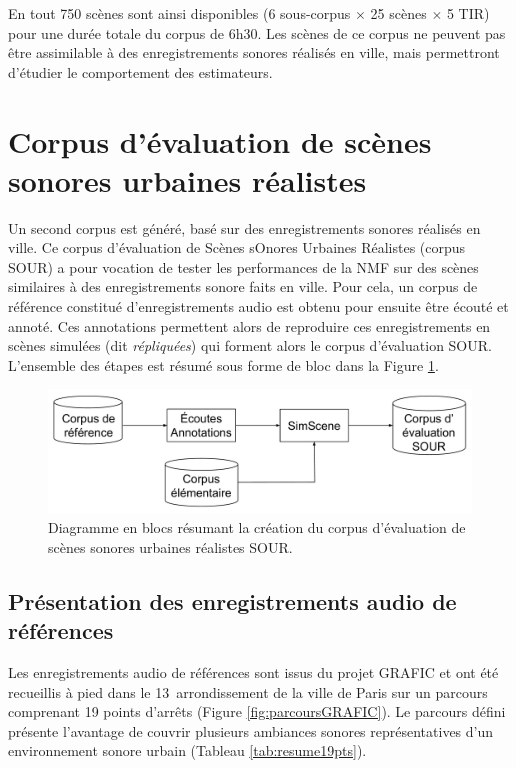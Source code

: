 En tout 750 scènes sont ainsi disponibles (6 sous-corpus $\times$ 25 scènes $\times$ 5 TIR) pour une durée totale du corpus de 6h30. Les scènes de ce corpus ne peuvent pas être assimilable à des enregistrements sonores réalisés en ville, mais permettront d'étudier le comportement des estimateurs. 

\section{Corpus d'évaluation de scènes sonores urbaines réalistes}
\label{part:corpus_grafic}

Un second corpus est généré, basé sur des enregistrements sonores réalisés en ville. Ce corpus d'évaluation de Scènes sOnores Urbaines Réalistes (corpus SOUR) a pour vocation de tester les performances de la NMF sur des scènes similaires à des enregistrements sonore faits en ville. Pour cela, un corpus de référence constitué d'enregistrements audio est obtenu pour ensuite être écouté et annoté. Ces annotations permettent alors de reproduire ces enregistrements en scènes simulées (dit \textit{répliquées}) qui forment alors le corpus d'évaluation SOUR. L'ensemble des étapes est résumé sous forme de bloc dans la Figure \ref{fig:bloc_diagram_annotation}.

\begin{figure}[ht]
\centering
\includegraphics[width=.7\textwidth]{./figures/autres/bloc_diagram_annotation.pdf}
\caption{Diagramme en blocs résumant la création du corpus d'évaluation de scènes sonores urbaines réalistes SOUR.}
\label{fig:bloc_diagram_annotation}
\end{figure}

\subsection{Présentation des enregistrements audio de références}

Les enregistrements audio de références sont issus du projet GRAFIC \cite{aumond2017modeling} et ont été recueillis à pied dans le 13\ieme~arrondissement de la ville de Paris sur un parcours comprenant 19 points d'arrêts (Figure \ref{fig:parcoursGRAFIC}). Le parcours défini présente l'avantage de couvrir plusieurs ambiances sonores représentatives d'un environnement sonore urbain (Tableau \ref{tab:resume19pts}).\\


